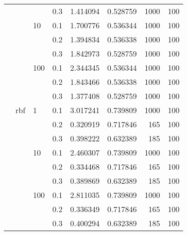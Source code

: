 \begin{table}[H]
\begin{tabular}{llllrrrr}
     &     &     & 0.3 &  1.414094 &  0.528759 &    1000 &   100 \\
     &     & 10  & 0.1 &  1.700776 &  0.536344 &    1000 &   100 \\
     &     &     & 0.2 &  1.394834 &  0.536338 &    1000 &   100 \\
     &     &     & 0.3 &  1.842973 &  0.528759 &    1000 &   100 \\
     &     & 100 & 0.1 &  2.344345 &  0.536344 &    1000 &   100 \\
     &     &     & 0.2 &  1.843466 &  0.536338 &    1000 &   100 \\
     &     &     & 0.3 &  1.377408 &  0.528759 &    1000 &   100 \\
     & rbf & 1   & 0.1 &  3.017241 &  0.739809 &    1000 &   100 \\
     &     &     & 0.2 &  0.320919 &  0.717846 &     165 &   100 \\
     &     &     & 0.3 &  0.398222 &  0.632389 &     185 &   100 \\
     &     & 10  & 0.1 &  2.460307 &  0.739809 &    1000 &   100 \\
     &     &     & 0.2 &  0.334468 &  0.717846 &     165 &   100 \\
     &     &     & 0.3 &  0.389869 &  0.632389 &     185 &   100 \\
     &     & 100 & 0.1 &  2.811035 &  0.739809 &    1000 &   100 \\
     &     &     & 0.2 &  0.336349 &  0.717846 &     165 &   100 \\
     &     &     & 0.3 &  0.400294 &  0.632389 &     185 &   100 \\
\bottomrule
\end{tabular}
\end{table}
